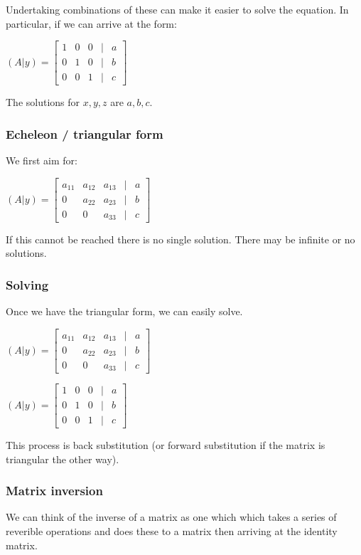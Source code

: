 Undertaking combinations of these can make it easier to solve the equation. In particular, if we can arrive at the form:

$(A|y)=\begin{bmatrix}1 & 0&0&|&a\\0 & 1&0&|&b\\0&0&1&|&c\end{bmatrix}$

The solutions for \(x,y,z\) are \(a,b,c\).

\subsubsection{Echeleon / triangular form}

We first aim for:

$(A|y)=\begin{bmatrix}a_{11} & a_{12}&a_{13}&|&a\\0 & a_{22}&a_{23}&|&b\\0&0&a_{33}&|&c\end{bmatrix}$

If this cannot be reached there is no single solution. There may be infinite or no solutions.

\subsubsection{Solving}

Once we have the triangular form, we can easily solve.

$(A|y)=\begin{bmatrix}a_{11} & a_{12}&a_{13}&|&a\\0 & a_{22}&a_{23}&|&b\\0&0&a_{33}&|&c\end{bmatrix}$

$(A|y)=\begin{bmatrix}1 & 0&0&|&a\\0 & 1&0&|&b\\0&0&1&|&c\end{bmatrix}$

This process is back substitution (or forward substitution if the matrix is triangular the other way).

\subsubsection{Matrix inversion}

We can think of the inverse of a matrix as one which which takes a series of reverible operations and does these to a matrix then arriving at the identity matrix.

